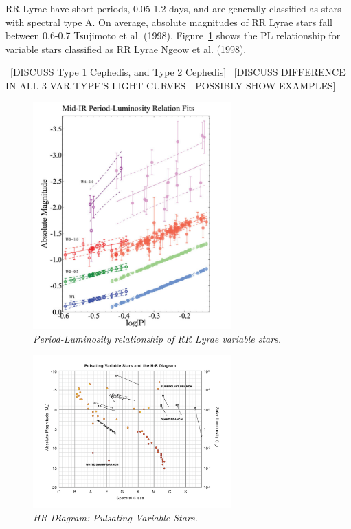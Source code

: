 \documentclass[letterpaper,11pt]{article}
\begin{document}
RR Lyrae have short periods, 0.05-1.2 days, and are generally classified as stars with spectral type A.  On average, absolute magnitudes of RR Lyrae stars fall between 0.6-0.7 Tsujimoto et al. (1998).  Figure~\ref{fig:plrelationrrlyrae} shows the PL relationship for variable stars classified as RR Lyrae Ngeow et al. (1998).

~[DISCUSS Type 1 Cephedis, and Type 2 Cephedis]
~[DISCUSS DIFFERENCE IN ALL 3 VAR TYPE'S LIGHT CURVES - POSSIBLY SHOW EXAMPLES]

\begin{figure}[htb!]
  \begin{center}
\centerline{\includegraphics[width=3in]{figures/PL_relation}}
\caption{\it \small{Period-Luminosity relationship of RR Lyrae variable stars. \label{fig:plrelationrrlyrae}}}
  \end{center}
\end{figure}
\begin{figure}[htb!]
  \begin{center}
\centerline{\includegraphics[width=3in]{figures/var_star_HR.png}}
\caption{\it \small{HR-Diagram: Pulsating Variable Stars. \label{fig:var-star-hr}}}
  \end{center}
\end{figure}
\end{document}
